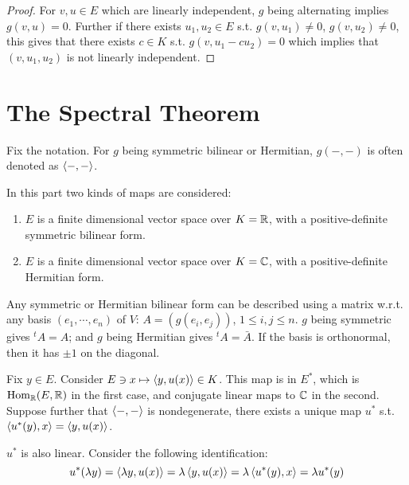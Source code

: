 \documentclass{article}
\begin{document}
\begin{proof}
    For $v, u \in E$ which are linearly independent, $g$ being alternating implies $g(v, u) = 0$. Further if there exists $u_1, u_2 \in E$ s.t. $g(v, u_1)\neq 0$, $g(v, u_2) \neq 0$, this gives that there exists $c \in K$ s.t. $g(v, u_1 - c u_2) = 0$ which implies that $(v, u_1, u_2)$ is not linearly independent.
\end{proof}

\section{The Spectral Theorem}

\begin{remark}
    Fix the notation. For $g$ being symmetric bilinear or Hermitian, $g(-, -)$ is often denoted as $\left\langle -, - \right\rangle$.
\end{remark}

In this part two kinds of maps are considered:
\begin{enumerate}
    \item $E$ is a finite dimensional vector space over $K = \mathbb{R}$, with a positive-definite symmetric bilinear form.
    \item $E$ is a finite dimensional vector space over $K = \mathbb{C}$, with a positive-definite Hermitian form.
\end{enumerate}

\begin{remark}
    Any symmetric or Hermitian bilinear form can be described using a matrix w.r.t. any basis $(e_1, \cdots, e_n)$ of $V$: $A = (g(e_i, e_j))$, $1 \leq i, j \leq n$. $g$ being symmetric gives $^t A = A$; and $g$ being Hermitian gives $^t A = \bar{A}$. If the basis is orthonormal, then it has $\pm 1$ on the diagonal.
\end{remark}

\begin{definition}
    Fix $y \in E$. Consider $E \ni x \mapsto \left\langle y, u(x) \right\rangle \in K$. This map is in $E^{\ast}$, which is $\mathrm{Hom}_{\mathbb{R}}(E, \mathbb{R})$ in the first case, and conjugate linear maps to $\mathbb{C}$ in the second. Suppose further that $\left\langle -, - \right\rangle$ is nondegenerate, there exists a unique map $u^{\ast}$ s.t. $\left\langle u^{\ast}(y), x \right\rangle = \left\langle y, u(x) \right\rangle$.
\end{definition}

\begin{remark}
    $u^{\ast}$ is also linear. Consider the following identification:
    \[
        u^{\ast}(\lambda y) = \left\langle \lambda y, u(x) \right\rangle = \lambda \left\langle y, u(x) \right\rangle = \lambda \left\langle u^{\ast}(y), x \right\rangle = \lambda u^{\ast}(y)
    \]
\end{remark}
\end{document}
